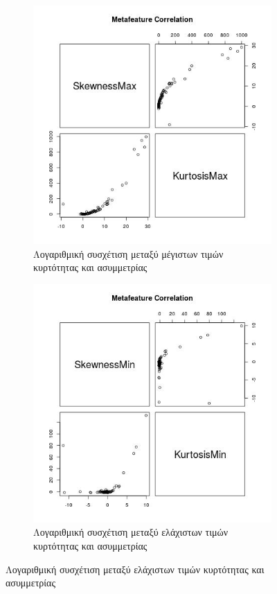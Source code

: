 \documentclass[]{article}
\numberwithin{equation}{section}		%
\numberwithin{figure}{section}			%
\numberwithin{table}{section}				%
\begin{document}
    \begin{figure}[H] %
    	\begin{subfigure}{0.48\textwidth}
    		\includegraphics[width=\linewidth, height = 0.2\textheight]{SkewnessMax_KurtosisMax_scatter.jpg}
    		\caption{Λογαριθμική συσχέτιση μεταξύ μέγιστων τιμών κυρτότητας και ασυμμετρίας} \label{fig:a}
    	\end{subfigure}\hspace*{\fill}
    	\begin{subfigure}{0.48\textwidth}
    		\includegraphics[width=\linewidth, height = 0.2\textheight]{SkewnessMin_KurtosisMin_scatter.jpg}
    		\caption{Λογαριθμική συσχέτιση μεταξύ ελάχιστων τιμών κυρτότητας και ασυμμετρίας} \label{fig:b}
    	\end{subfigure}
    	

\end{figure}
\end{document}
